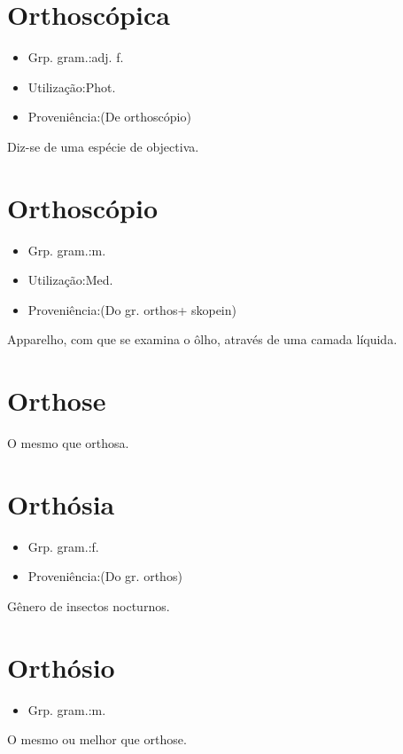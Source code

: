 \section{Orthoscópica}
\begin{itemize}
\item {Grp. gram.:adj. f.}
\end{itemize}
\begin{itemize}
\item {Utilização:Phot.}
\end{itemize}
\begin{itemize}
\item {Proveniência:(De \textunderscore orthoscópio\textunderscore )}
\end{itemize}
Diz-se de uma espécie de objectiva.
\section{Orthoscópio}
\begin{itemize}
\item {Grp. gram.:m.}
\end{itemize}
\begin{itemize}
\item {Utilização:Med.}
\end{itemize}
\begin{itemize}
\item {Proveniência:(Do gr. \textunderscore orthos\textunderscore  + \textunderscore skopein\textunderscore )}
\end{itemize}
Apparelho, com que se examina o ôlho, através de uma camada líquida.
\section{Orthose}
O mesmo que \textunderscore orthosa\textunderscore .
\section{Orthósia}
\begin{itemize}
\item {Grp. gram.:f.}
\end{itemize}
\begin{itemize}
\item {Proveniência:(Do gr. \textunderscore orthos\textunderscore )}
\end{itemize}
Gênero de insectos nocturnos.
\section{Orthósio}
\begin{itemize}
\item {Grp. gram.:m.}
\end{itemize}
O mesmo ou melhor que \textunderscore orthose\textunderscore .
